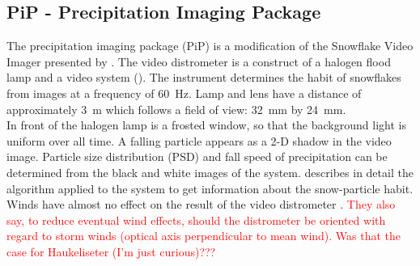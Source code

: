 \subsection{PiP - Precipitation Imaging Package}

The precipitation imaging package (PiP) is a modification of the Snowflake Video Imager presented by \cite{newman_presenting_2009}. The video distrometer is a construct of a halogen flood lamp and a video system (). The instrument determines the habit of snowflakes from images at a frequency of \SI{60}{\Hz}. Lamp and lens have a distance of approximately \SI{3}{\metre} which follows a field of view: \SI{32}{\mm} by \SI{24}{\mm}. 
\\
In front of the halogen lamp is a frosted window, so that the background light is uniform over all time. A falling particle appears as a 2-D shadow in the video image. 
Particle size distribution (PSD) and fall speed of precipitation can be determined from the black and white images of the system.
\cite{newman_presenting_2009} describes in detail the algorithm applied to the system to get information about the snow-particle habit. \\
Winds have almost no effect on the result of the video distrometer \citep{newman_presenting_2009}. \textcolor{red}{They also say, to reduce eventual wind effects, should the distrometer be oriented with regard to storm winds (optical axis perpendicular to mean wind). Was that the case for Haukeliseter (I'm just curious)???}

